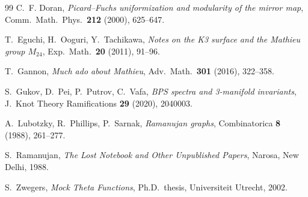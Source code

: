 \documentclass[11pt,a4paper]{article}
\theoremstyle{plain}
\theoremstyle{definition}
\theoremstyle{remark}
\begin{document}
\begin{thebibliography}{99}
C.~F. Doran,
\emph{Picard--Fuchs uniformization and modularity of the mirror map},
Comm.\ Math.\ Phys.\ \textbf{212} (2000), 625--647.

T.~Eguchi, H.~Ooguri, Y.~Tachikawa,
\emph{Notes on the K3 surface and the Mathieu group $M_{24}$},
Exp.\ Math.\ \textbf{20} (2011), 91--96.

T.~Gannon,
\emph{Much ado about Mathieu},
Adv.\ Math.\ \textbf{301} (2016), 322--358.

S.~Gukov, D.~Pei, P.~Putrov, C.~Vafa,
\emph{BPS spectra and 3-manifold invariants},
J.\ Knot Theory Ramifications \textbf{29} (2020), 2040003.

A.~Lubotzky, R.~Phillips, P.~Sarnak,
\emph{Ramanujan graphs},
Combinatorica \textbf{8} (1988), 261--277.

S.~Ramanujan,
\emph{The Lost Notebook and Other Unpublished Papers},
Narosa, New Delhi, 1988.

S.~Zwegers,
\emph{Mock Theta Functions},
Ph.D.\ thesis, Universiteit Utrecht, 2002.

\end{thebibliography}
\end{document}
